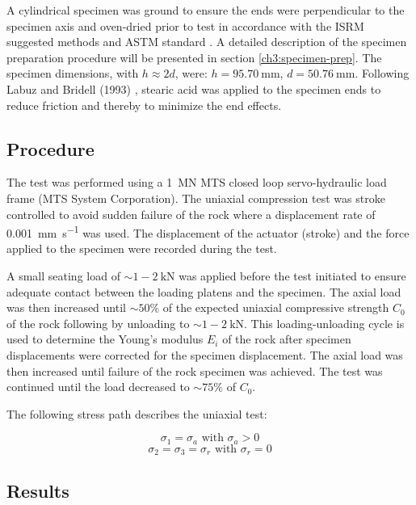 A cylindrical specimen was ground to ensure the ends were perpendicular to the specimen axis and oven-dried prior to test in accordance with the ISRM suggested methods \cite{ISRM2015} and ASTM standard \cite{ASTM2019}. A detailed description of the specimen preparation procedure will be presented in section \ref{ch3:specimen-prep}. The specimen dimensions, with $h\approx 2d$, were: $h = \SI{95.70}{\milli\meter}$, $d = \SI{50.76}{\milli\meter}$. Following Labuz and Bridell (1993) \cite{Labuz1993}, stearic acid was applied to the specimen ends to reduce friction and thereby to minimize the end effects.

\subsection{Procedure}

The test was performed using a \SI{1}{\mega\newton} MTS closed loop servo-hydraulic load frame (MTS System Corporation). The uniaxial compression test was stroke controlled to avoid sudden failure of the rock where a displacement rate of \SI{0.001}{\milli\meter\per\second} was used. The displacement of the actuator (stroke) and the force applied to the specimen were recorded during the test.

A small seating load of $\sim 1-\SI{2}{\kilo\newton}$ was applied before the test initiated to ensure adequate contact between the loading platens and the specimen. The axial load was then increased until $\sim 50\%$ of the expected uniaxial compressive strength $C_0$ of the rock following by unloading to $\sim 1-\SI{2}{\kilo\newton}$. This loading-unloading cycle is used to determine the Young’s modulus $E_i$ of the rock after specimen displacements were corrected for the specimen displacement. The axial load was then increased until failure of the rock specimen was achieved. The test was continued until the load decreased to $\sim 75\%$ of $C_0$. 

The following stress path describes the uniaxial test: 

\begin{equation}
    \sigma_1 = \sigma_a \text{ with } \sigma_a > 0
\end{equation}
\begin{equation}
    \sigma_2 = \sigma_3 = \sigma_r   \text{ with } \sigma_r = 0
\end{equation}
    

\subsection{Results}

